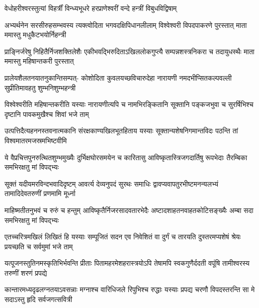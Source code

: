 

\twolineshloka
{वेधोहरीश्वरस्तुत्यां विहर्त्रीं विन्ध्यभूधरे}
{हरप्राणेश्वरीं वन्दे हन्त्रीं विबुधविद्विषाम्}%

\fourlineindentedshloka
{अभ्यर्थनेन सरसीरुहसम्भवस्य}
{त्यक्त्वोदिता भगवदक्षिपिधानलीलाम्}
{विश्वेश्वरी विपदपाकरणे पुरस्तात्}
{माता ममास्तु मधुकैटभयोर्निहन्त्री} %

\fourlineindentedshloka
{प्राङ्निर्जरेषु निहितैर्निजशक्तिलेशैः}
{एकीभवद्भिरुदिताऽखिललोकगुप्त्यै}
{सम्पन्नशस्त्रनिकरा च तदायुधस्थैः}
{माता ममास्तु महिषान्तकरी पुरस्तात्} %

\fourlineindentedshloka
{प्रालेयशैलतनयातनुकान्तिसम्पत्-}
{कोशोदिता कुवलयच्छविचारुदेहा}
{नारायणी नमदभीप्सितकल्पवल्ली}
{सुप्रीतिमावहतु शुम्भनिशुम्भहन्त्री} %


\fourlineindentedshloka
{विश्वेश्वरीति महिषान्तकरीति यस्याः}
{नारायणीत्यपि च नामभिरङ्कितानि}
{सूक्तानि पङ्कजभुवा च सुरर्षिभिश्च}
{दृष्टानि पावकमुखैश्च शिवां भजे ताम्} %


\fourlineindentedshloka
{उत्पत्तिदैत्यहननस्तवनात्मकानि}
{संरक्षकाण्यखिलभूतहिताय यस्याः}
{सूक्तान्यशेषनिगमान्तविदः पठन्ति}
{तां विश्वमातरमजस्रमभिष्टवीमि} %

\fourlineindentedshloka
{ये वैप्रचित्तपुनरुत्थितशुम्भमुख्यैः}
{दुर्भिक्षघोरसमयेन च कारितासु}
{आविष्कृतास्त्रिजगदार्तिषु रूपभेदाः}
{तैरम्बिका समभिरक्षतु मां विपद्भ्यः} %


\fourlineindentedshloka
{सूक्तं यदीयमरविन्दभवादिदृष्टम्}
{आवर्त्य देव्यनुपदं सुरथः समाधिः}
{द्वावप्यवापतुरभीष्टमनन्यलभ्यं}
{तामादिदेवतरुणीं प्रणमामि मूर्ध्ना} %

\fourlineindentedshloka
{माहिष्मतीतनुभवं च रुरुं च हन्तुम्}
{आविष्कृतैर्निजरसादवतारभेदैः}
{अष्टादशाहतनवाहतकोटिसङ्ख्यैः}
{अम्बा सदा समभिरक्षतु मां विपद्भ्यः} %

\fourlineindentedshloka
{एतच्चरित्रमखिलं लिखितं हि यस्याः}
{सम्पूजितं सदन एव निवेशितं वा}
{दुर्गं च तारयति दुस्तरमप्यशेषं}
{श्रेयः प्रयच्छति च सर्वमुमां भजे ताम्} %


\fourlineindentedshloka
{यत्पूजनस्तुतिनमस्कृतिभिर्भवन्ति}
{प्रीताः पितामहरमेशहरास्त्रयोऽपि}
{तेषामपि स्वकगुणैर्ददती वपूंषि}
{तामीश्वरस्य तरुणीं शरणं प्रपद्ये} %


\fourlineindentedshloka
{कान्तारमध्यदृढलग्नतयाऽवसन्नाः}
{मग्नाश्च वारिधिजले रिपुभिश्च रुद्धाः}
{यस्याः प्रपद्य चरणौ विपदस्तरन्ति}
{सा मे सदाऽस्तु हृदि सर्वजगत्सवित्री} %


